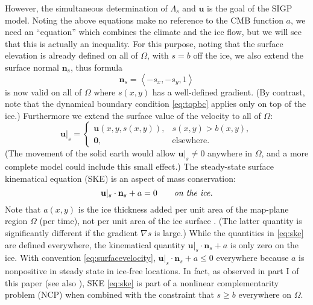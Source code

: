 \documentclass[letterpaper,final,12pt,reqno]{amsart}
\theoremstyle{claim}
\newcommand{\grad}{\nabla}
\newcommand{\bn}{\mathbf{n}}
\newcommand{\bu}{\mathbf{u}}
\newcommand{\bzero}{\bm{0}}
\numberwithin{equation}{section}
\numberwithin{figure}{section}
\numberwithin{table}{section}
\numberwithin{theorem}{section}
\begin{document}
\newcommand{\bus}{\bu|_s}

However, the simultaneous determination of $\Lambda_s$ and $\bu$ is the goal of the SIGP model.  Noting the above equations make no reference to the CMB function $a$, we need an ``equation'' which combines the climate and the ice flow, but we will see that this is actually an inequality.  For this purpose, noting that the surface elevation is already defined on all of $\Omega$, with $s=b$ off the ice, we also extend the surface normal $\bn_s$, thus formula
\begin{equation}
\bn_s = \left<-s_x,-s_y,1\right> \label{eq:surfacenormal}
\end{equation}
is now valid on all of $\Omega$ where $s(x,y)$ has a well-defined gradient.  (By contrast, note that the dynamical boundary condition \eqref{eq:topbc} applies only on top of the ice.)  Furthermore we extend the surface value of the velocity to all of $\Omega$:
\begin{equation}
\bus = \begin{cases} \bu(x,y,s(x,y)), & s(x,y) > b(x,y), \\
                     \bzero, & \text{elsewhere}. \end{cases} \label{eq:surfacevelocity}
\end{equation}
(The movement of the solid earth would allow $\bus\ne 0$ anywhere in $\Omega$, and a more complete model could include this small effect.)  The steady-state surface kinematical equation (SKE) \cite[see equation (5.21)]{GreveBlatter2009} is an aspect of mass conservation:
\begin{equation}
\bus \cdot \bn_s + a = 0 \qquad \text{\emph{on the ice}}. \label{eq:ske}
\end{equation}
Note that $a(x,y)$ is the ice thickness added per unit area of the map-plane region $\Omega$ (per time), not per unit area of the ice surface \cite[compare]{GreveBlatter2009}.  (The latter quantity is significantly different if the gradient $\grad s$ is large.)  While the quantities in \eqref{eq:ske} are defined everywhere, the kinematical quantity $\bus \cdot \bn_s + a$ is only zero on the ice.  With convention \eqref{eq:surfacevelocity}, $\bus \cdot \bn_s + a \le 0$ everywhere because $a$ is nonpositive in steady state in ice-free locations.  In fact, as observed in part I of this paper \cite{Bueler2022} (see also \cite{Bueler2021conservation}), SKE \eqref{eq:ske} is part of a nonlinear complementarity problem (NCP) when combined with the constraint that $s\ge b$ everywhere on $\Omega$.
\end{document}
